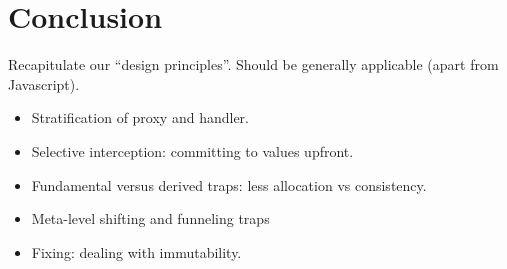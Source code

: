 \documentclass{acm_proc_article-sp}
\begin{document}
\section{Conclusion}

Recapitulate our ``design principles''. Should be generally applicable (apart from Javascript).
\begin{itemize}
  \item Stratification of proxy and handler.
  \item Selective interception: committing to values upfront.
  \item Fundamental versus derived traps: less allocation vs consistency.
  \item Meta-level shifting and funneling traps
  \item Fixing: dealing with immutability.
\end{itemize}



\end{document}
